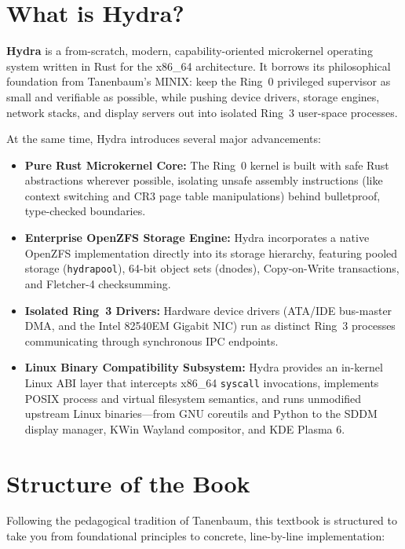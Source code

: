\section*{What is Hydra?}

\textbf{Hydra} is a from-scratch, modern, capability-oriented microkernel operating system written in Rust for the x86\_64 architecture. It borrows its philosophical foundation from Tanenbaum's MINIX: keep the Ring~0 privileged supervisor as small and verifiable as possible, while pushing device drivers, storage engines, network stacks, and display servers out into isolated Ring~3 user-space processes.

At the same time, Hydra introduces several major advancements:
\begin{itemize}
    \item \textbf{Pure Rust Microkernel Core:} The Ring~0 kernel is built with safe Rust abstractions wherever possible, isolating unsafe assembly instructions (like context switching and CR3 page table manipulations) behind bulletproof, type-checked boundaries.
    \item \textbf{Enterprise OpenZFS Storage Engine:} Hydra incorporates a native OpenZFS implementation directly into its storage hierarchy, featuring pooled storage (\texttt{hydrapool}), 64-bit object sets (dnodes), Copy-on-Write transactions, and Fletcher-4 checksumming.
    \item \textbf{Isolated Ring~3 Drivers:} Hardware device drivers (ATA/IDE bus-master DMA, and the Intel 82540EM Gigabit NIC) run as distinct Ring~3 processes communicating through synchronous IPC endpoints.
    \item \textbf{Linux Binary Compatibility Subsystem:} Hydra provides an in-kernel Linux ABI layer that intercepts x86\_64 \texttt{syscall} invocations, implements POSIX process and virtual filesystem semantics, and runs unmodified upstream Linux binaries—from GNU coreutils and Python to the SDDM display manager, KWin Wayland compositor, and KDE Plasma 6.
\end{itemize}

\section*{Structure of the Book}

Following the pedagogical tradition of Tanenbaum, this textbook is structured to take you from foundational principles to concrete, line-by-line implementation:

